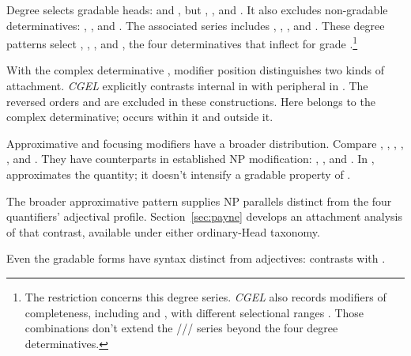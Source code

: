 \documentclass[12pt]{article}
\begin{document}
Degree  selects gradable heads:  and , but , , and . It also excludes non-gradable determinatives: , , and . The associated series includes , , , and . These degree patterns select , , , and , the four determinatives that inflect for grade \citep[393--395, 431--432]{huddleston2002}.\footnote{The restriction concerns this degree series. \textit{CGEL} also records modifiers of completeness, including  and , with different selectional ranges \citep[432]{huddleston2002}. Those combinations don't extend the /// series beyond the four degree determinatives.}

With the complex determinative , modifier position distinguishes two kinds of attachment. \textit{CGEL} explicitly contrasts internal  in  with peripheral  in  \citep[p.~392, (61)]{huddleston2002}. The reversed orders  and  are excluded in these constructions. Here  belongs to the complex determinative;  occurs within it and  outside it.

Approximative and focusing modifiers have a broader distribution. Compare , , , , , and . They have counterparts in established NP modification: , , and . In ,  approximates the quantity; it doesn't intensify a gradable property of .

The broader approximative pattern supplies NP parallels distinct from the four quantifiers' adjectival profile. Section~\ref{sec:payne} develops an attachment analysis of that contrast, available under either ordinary-Head taxonomy.

Even the gradable forms have syntax distinct from adjectives:  contrasts with  \citep[392--396, 431--432, 539--540]{huddleston2002}.
\end{document}
